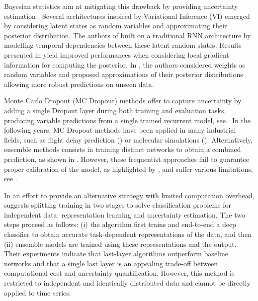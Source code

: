 \documentclass{article}
\begin{document}
Bayesian statistics aim at mitigating this drawback by providing uncertainty estimation \cite{Hinton1995BayesianLF}. Several architectures inspired by Variational Inference (VI) emerged by considering latent states as random variables and approximating their posterior distribution.
The authors of \cite{Chung2015NIPS} built on a traditional RNN architecture by modelling temporal dependencies between these latent random states.
Results presented in \cite{Fortunato2017bayesian} yield improved performances when considering local gradient information for computing the posterior.
In \cite{Blundell2015}, the authors considered weights as random variables and proposed approximations of their posterior distributions allowing more robust predictions on unseen data.

Monte Carlo Dropout (MC Dropout) methods offer to capture uncertainty by adding a single  Dropout layer during both training and evaluation tasks, producing variable predictions from a single trained recurrent model, see \cite{Gal2016NIPS}.
In the following years, MC Dropout methods have been applied in many industrial fields, such as flight delay prediction (\cite{Vandal2018}) or molecular simulations (\cite{Wen2020UncertaintyQI}).
Alternatively, ensemble methods consists in training distinct networks to obtain a combined prediction, as shown in \cite{Pearce2018}.
However, these frequentist approaches fail to guarantee proper calibration of the model, as highlighted by \cite{ashukha2020pitfalls}, and suffer various limitations, see \cite{Fong2020}.

In an effort to provide an alternative strategy with limited computation overhead, \cite{Brosse2020OnLA} suggests splitting training in two stages to solve classification problems for independent data: representation learning and uncertainty estimation. The two steps proceed as follows: (i) the algorithm first trains and end-to-end a deep classifier to obtain accurate task-dependent representations of the data, and then (ii) ensemble models are trained using these representations and the output. Their experiments indicate that last-layer algorithms outperform baseline networks and that a single last layer is an appealing trade-off between computational cost and uncertainty quantification. However, this method is restricted to independent and identically distributed data and cannot be directly applied to time series.
\end{document}

